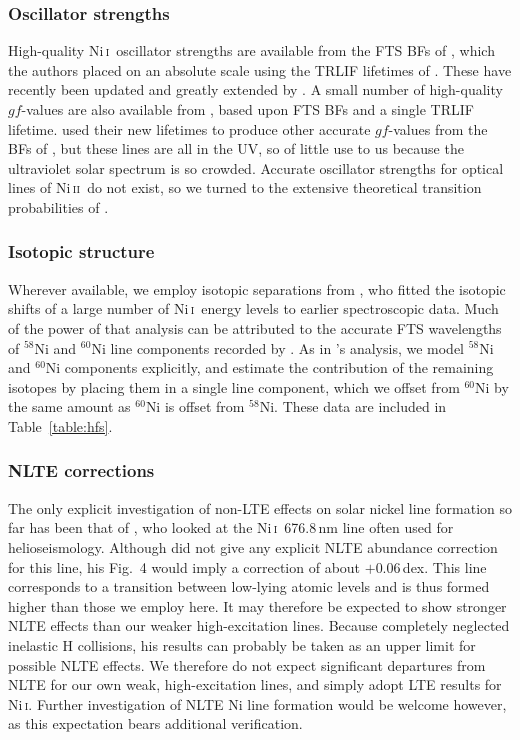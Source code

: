\documentclass[traditabstract]{aa}
\newcommand{\altnii}{Ni\,\textsc{i}}
\newcommand{\altniii}{Ni\,\textsc{ii}}
\newcommand{\nii}{\altnii\ }
\newcommand{\niii}{\altniii\ }
\begin{document}
\subsubsection{Oscillator strengths}
\label{Nigfs}

High-quality \nii oscillator strengths are available from the FTS BFs of \citet{Wickliffe97}, which the authors placed
on an absolute scale using the TRLIF lifetimes of \citet{Bergeson93a}.  These have recently been updated and greatly extended by \citet{Wood14}. 
A small number of high-quality $gf$-values are also available from \citet{Johansson03}, based upon FTS BFs and a single 
TRLIF lifetime.  \citet{Bergeson93a} used their
new lifetimes to produce other accurate $gf$-values from the BFs of \citet{Blackwell89}, but these lines are all in the UV,
so of little use to us because the ultraviolet solar spectrum is so crowded.  Accurate oscillator strengths for optical 
lines of \niii do not exist, so we turned to the extensive theoretical transition probabilities of \citet{Fritzsche00}.

\subsubsection{Isotopic structure}
\label{Nihfs}

Wherever available, we employ isotopic separations from \citet{Wood14}, who fitted the isotopic shifts of a large number of \nii energy levels to earlier spectroscopic data.  Much of the power of that analysis can be attributed to the accurate FTS wavelengths of $^{58}$Ni and $^{60}$Ni line components recorded by \citet{Litzen93}.  As in \citeauthor{Wood14}'s analysis, we model $^{58}$Ni and $^{60}$Ni components explicitly, and estimate the contribution of the remaining isotopes by placing them in a single line component, which we offset from $^{60}$Ni by the same amount as $^{60}$Ni is offset from $^{58}$Ni.  These data are included in Table~\ref{table:hfs}.
 
\subsubsection{NLTE corrections}
\label{NiNLTE}

The only explicit investigation of non-LTE effects on solar nickel line formation so far has been that of \citet{Bruls93}, who looked at the \nii 676.8\,nm line often used for helioseismology.  Although \citeauthor{Bruls93} did not give any explicit NLTE abundance correction for this line, his Fig.~4 would imply a correction of about $+$0.06\,dex.  This line corresponds to a transition between low-lying atomic levels and is thus formed higher than those we employ here.  It may therefore be expected to show stronger NLTE effects than our weaker high-excitation lines. Because \citet{Bruls93} completely neglected inelastic H collisions, his results can probably be taken as an upper limit for possible NLTE effects. We therefore do not expect significant departures from NLTE for our own weak, high-excitation lines, and simply adopt LTE results for \altnii.  Further investigation of NLTE Ni line formation \citep[e.g.][]{Vieytes13} would be welcome however, as this expectation bears additional verification.
\end{document}
